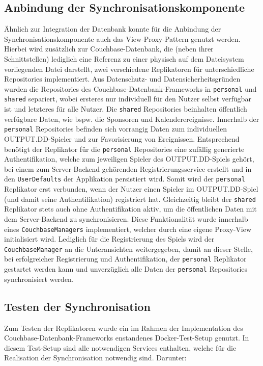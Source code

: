 \subsection{Anbindung der Synchronisationskomponente}

Ähnlich zur Integration der Datenbank konnte für die Anbindung der Synchronisationskomponente auch das View-Proxy-Pattern genutzt werden. Hierbei wird zusätzlich zur Couchbase-Datenbank, die (neben ihrer Schnittstellen) lediglich eine Referenz zu einer physisch auf dem Dateisystem vorliegenden Datei darstellt, zwei verschiedene Replikatoren für unterschiedliche Repositories implementiert. Aus Datenschutz- und Datensicherheitsgründen wurden die Repositories des Couchbase-Datenbank-Frameworks in \texttt{personal} und \texttt{shared} separiert, wobei ersteres nur individuell für den Nutzer selbst verfügbar ist und letzteres für alle Nutzer. Die \texttt{shared} Repositories beinhalten öffentlich verfügbare Daten, wie bspw. die Sponsoren und Kalenderereignisse. Innerhalb der \texttt{personal} Repositories befinden sich vorrangig Daten zum individuellen OUTPUT.DD-Spieler und zur Favorisierung von Ereignissen. Entsprechend benötigt der Replikator für die \texttt{personal} Repositories eine zufällig generierte Authentifikation, welche zum jeweiligen Spieler des OUTPUT.DD-Spiels gehört, bei einem zum Server-Backend gehörenden Registrierungsservice erstellt und in den \texttt{UserDefaults} der Applikation persistiert wird. Somit wird der \texttt{personal} Replikator erst verbunden, wenn der Nutzer einen Spieler im OUTPUT.DD-Spiel (und damit seine Authentifikation) registriert hat. Gleichzeitig bleibt der \texttt{shared} Replikator stets auch ohne Authentifikation aktiv, um die öffentlichen Daten mit dem Server-Backend zu synchronisieren. Diese Funktionalität wurde innerhalb eines \texttt{CouchbaseManagers} implementiert, welcher durch eine eigene Proxy-View initialisiert wird. Lediglich für die Registrierung des Spiels wird der \texttt{CouchbaseManager} an die Unteransichten weitergegeben, damit an dieser Stelle, bei erfolgreicher Registrierung und Authentifikation, der \texttt{personal} Replikator gestartet werden kann und unverzüglich alle Daten der \texttt{personal} Repositories synchronisiert werden.

\subsection{Testen der Synchronisation}

Zum Testen der Replikatoren wurde ein im Rahmen der Implementation des Couchbase-Datenbank-Frameworks enstandenes Docker-Test-Setup genutzt. In diesem Test-Setup sind alle notwendigen Services enthalten, welche für die Realisation der Synchronisation notwendig sind. Darunter:

